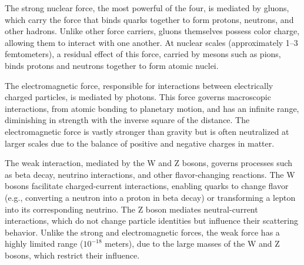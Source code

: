The strong nuclear force, the most powerful of the four, is mediated by gluons, which carry the force that binds quarks together to form protons, neutrons, and other hadrons. Unlike other force carriers, gluons themselves possess color charge, allowing them to interact with one another. At nuclear scales (approximately 1–3 femtometers), a residual effect of this force, carried by mesons such as pions, binds protons and neutrons together to form atomic nuclei.  

The electromagnetic force, responsible for interactions between electrically charged particles, is mediated by photons. This force governs macroscopic interactions, from atomic bonding to planetary motion, and has an infinite range, diminishing in strength with the inverse square of the distance. The electromagnetic force is vastly stronger than gravity but is often neutralized at larger scales due to the balance of positive and negative charges in matter.  

The weak interaction, mediated by the W and Z bosons, governs processes such as beta decay, neutrino interactions, and other flavor-changing reactions. The W bosons facilitate charged-current interactions, enabling quarks to change flavor (e.g., converting a neutron into a proton in beta decay) or transforming a lepton into its corresponding neutrino. The Z boson mediates neutral-current interactions, which do not change particle identities but influence their scattering behavior. Unlike the strong and electromagnetic forces, the weak force has a highly limited range ($10^{-18}$ meters), due to the large masses of the W and Z bosons, which restrict their influence.  





